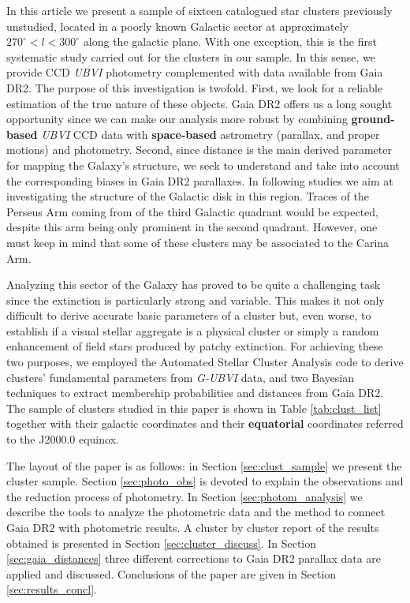 \documentclass[referee]{aa}
\begin{document}
In this article we present a sample of sixteen catalogued star clusters
\citep{Dias_2002} previously unstudied, located in a poorly known Galactic sector
at approximately $270^\circ<l<300^\circ$ along the galactic plane.
With one exception, this is
the first systematic study carried out for the clusters in our sample. In this
sense, we provide CCD \textit{UBVI} photometry complemented with data available
from Gaia DR2. The purpose of this investigation is twofold. First, we look
for a reliable estimation of the true nature of these objects. Gaia DR2 offers
us a long sought opportunity since we can make our analysis more robust by
combining  \textbf{ground-based} \textit{UBVI} CCD data with \textbf{space-based} astrometry 
(parallax, and proper motions) and photometry. Second, since distance is the
main derived parameter for mapping the Galaxy’s structure, we seek to
understand and take
into account the corresponding biases in Gaia DR2 parallaxes.
In following studies we aim at investigating the structure of the
Galactic disk in this region. Traces of the Perseus Arm coming from of the
third Galactic quadrant  would be expected, despite this arm being only
prominent in the second quadrant. However, one must keep in mind 
that some of these clusters may be associated to the Carina Arm.

Analyzing this sector of the Galaxy has proved to be quite a challenging
task since the extinction is particularly strong and variable. This
makes it not only difficult to derive accurate basic parameters of a cluster
but, even worse, to establish if a visual stellar aggregate is a physical
cluster or simply a random enhancement of field stars produced by patchy
extinction. 
%
For achieving these two purposes, we employed the Automated Stellar
Cluster Analysis code \citep[\texttt{ASteCA};][]{Perren_2015} to derive
clusters' fundamental parameters from \textit{G-UBVI} data, and two Bayesian
techniques to extract membership probabilities and distances from Gaia DR2. The
sample of clusters studied in this paper is shown in Table 
\ref{tab:clust_list} together with their galactic coordinates and their
\textbf{equatorial} coordinates referred to the J2000.0 equinox.

The layout of the paper is as follows: in Section \ref{sec:clust_sample} we
present the cluster sample.
Section \ref{sec:photo_obs} is devoted to explain the observations and the
reduction process of photometry. In Section \ref{sec:photom_analysis} we
describe the tools to analyze the photometric data and the method to connect
Gaia DR2 with photometric results. A cluster by cluster report of the results
obtained is presented in Section \ref{sec:cluster_discuss}. In Section
\ref{sec:gaia_distances} three different corrections to Gaia DR2 parallax
data are applied and discussed. Conclusions of the paper are given in Section 
\ref{sec:results_concl}.
\end{document}
